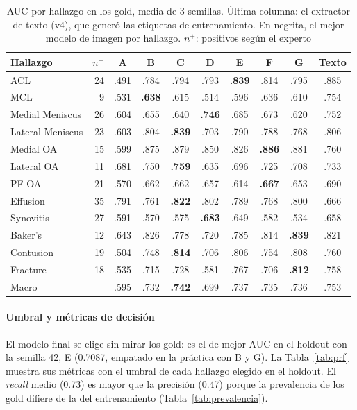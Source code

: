 \documentclass[conference]{IEEEtran}
\begin{document}
\begin{table}[t]
  \caption{AUC por hallazgo en los gold, media de 3 semillas. Última columna: el extractor de texto (v4), que generó las etiquetas de entrenamiento. En negrita, el mejor modelo de imagen por hallazgo. $n^{+}$: positivos según el experto}
  \label{tab:auc-hallazgo}
  \centering
  \footnotesize
  \begin{tabular}{@{}lrccccccc|c@{}}
    \toprule
    Hallazgo & $n^{+}$ & A & B & C & D & E & F & G & Texto \\
    \midrule
    ACL              & 24 & .491 & .784 & .794 & .793 & \textbf{.839} & .814 & .795 & .885 \\
    MCL              &  9 & .531 & \textbf{.638} & .615 & .514 & .596 & .636 & .610 & .754 \\
    Medial Meniscus  & 26 & .604 & .655 & .640 & \textbf{.746} & .685 & .673 & .620 & .752 \\
    Lateral Meniscus & 23 & .603 & .804 & \textbf{.839} & .703 & .790 & .788 & .768 & .806 \\
    Medial OA        & 15 & .599 & .875 & .879 & .850 & .826 & \textbf{.886} & .881 & .760 \\
    Lateral OA       & 11 & .681 & .750 & \textbf{.759} & .635 & .696 & .725 & .708 & .733 \\
    PF OA            & 21 & .570 & .662 & .662 & .657 & .614 & \textbf{.667} & .653 & .690 \\
    Effusion         & 35 & .791 & .761 & \textbf{.822} & .802 & .789 & .768 & .800 & .666 \\
    Synovitis        & 27 & .591 & .570 & .575 & \textbf{.683} & .649 & .582 & .534 & .658 \\
    Baker's          & 12 & .643 & .826 & .778 & .720 & .785 & .814 & \textbf{.839} & .821 \\
    Contusion        & 19 & .504 & .748 & \textbf{.814} & .706 & .806 & .754 & .808 & .760 \\
    Fracture         & 18 & .535 & .715 & .728 & .581 & .767 & .706 & \textbf{.812} & .758 \\
    \midrule
    Macro            &    & .595 & .732 & \textbf{.742} & .699 & .737 & .735 & .736 & .753 \\
    \bottomrule
  \end{tabular}
\end{table}

\paragraph*{Umbral y métricas de decisión}
El modelo final se elige sin mirar los gold: es el de mejor AUC en el holdout con la semilla 42, E (0.7087, empatado en la práctica con B y G).
La Tabla~\ref{tab:prf} muestra sus métricas con el umbral de cada hallazgo elegido en el holdout.
El \emph{recall} medio (0.73) es mayor que la precisión (0.47) porque la prevalencia de los gold difiere de la del entrenamiento (Tabla~\ref{tab:prevalencia}).
\end{document}
